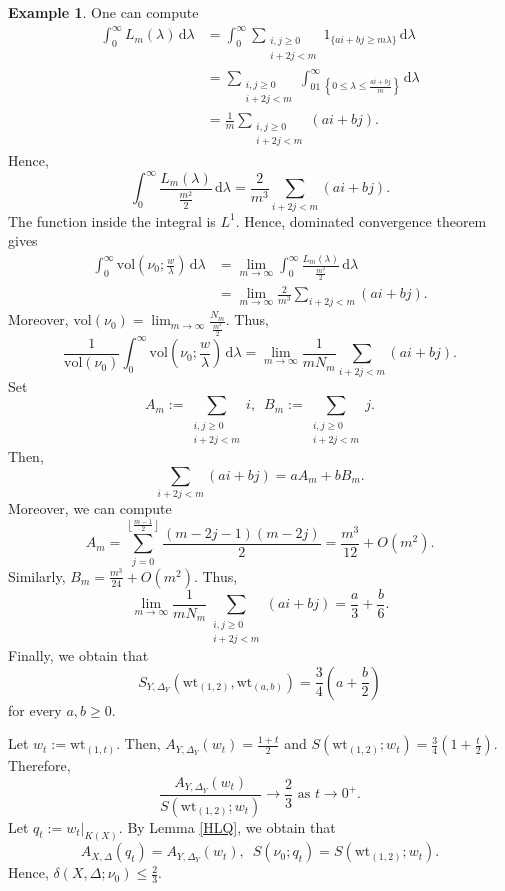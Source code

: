 \documentclass[a4paper,12pt]{amsart}
\theoremstyle{definition} %
\newtheorem{example}[theorem]{Example}
\theoremstyle{remark}
\numberwithin{equation}{section}
\newcommand{\floor}[1]{\left\lfloor #1 \right\rfloor}
\begin{document}
\begin{example}
One can compute
$$ \begin{aligned}
\int^{\infty}_0L_m(\lambda)\,\mathrm{d}\lambda&=\int^{\infty}_0\sum_{\substack{i,j\ge 0 \\ i+2j<m}}1_{\{ai+bj\ge m\lambda\}}\,\mathrm{d}\lambda
\\ &=\sum_{\substack{i,j\ge 0 \\ i+2j<m}}\int^{\infty}_01_{\left\{0\le \lambda\le \frac{ai+bj}{m}\right\}}\,\mathrm{d}\lambda
\\ &=\frac{1}{m}\sum_{\substack{i,j\ge 0 \\ i+2j<m}}(ai+bj).
\end{aligned}$$
Hence,
$$ \int^{\infty}_{0}\frac{L_m(\lambda)}{\frac{m^2}{2}}\,\mathrm{d}\lambda=\frac{2}{m^3}\sum_{i+2j<m}(ai+bj).$$
The function inside the integral is $L^1$. Hence, dominated convergence theorem gives
$$
\begin{aligned}
\int^{\infty}_0\mathrm{vol}\left(\nu_0;\frac{w}{\lambda}\right)\,\mathrm{d}\lambda&=\lim_{m\to \infty}\int^{\infty}_0\frac{L_m(\lambda)}{\frac{m^2}{2}}\,\mathrm{d}\lambda
\\ &=\lim_{m\to \infty}\frac{2}{m^3}\sum_{i+2j<m}(ai+bj).
\end{aligned}
$$
Moreover, $ \mathrm{vol}(\nu_0)=\lim_{m\to \infty}\frac{N_m}{\frac{m^2}{2}}.$ Thus,
$$
\frac{1}{\mathrm{vol}(\nu_0)}\int^{\infty}_0\mathrm{vol}\left(\nu_0;\frac{w}{\lambda}\right)\,\mathrm{d}\lambda=\lim_{m\to \infty}\frac{1}{mN_m}\sum_{i+2j<m}(ai+bj).
$$
Set
$$A_m:=\sum_{\substack{i,j\ge0\\i+2j<m}}i,\,\,\,
B_m:=\sum_{\substack{i,j\ge0\\i+2j<m}}j.$$
Then,
$$\sum_{i+2j<m}(ai+bj)=aA_m+bB_m.$$
Moreover, we can compute
$$ A_m=\sum^{\floor{\frac{m-1}{2}}}_{j=0}\frac{(m-2j-1)(m-2j)}{2}=\frac{m^3}{12}+O(m^2).$$
Similarly, $B_m=\frac{m^3}{24}+O(m^2)$. Thus,
$$ \lim_{m\to \infty}\frac{1}{mN_m}\sum_{\substack{i,j\ge 0 \\ i+2j<m}}(ai+bj)=\frac{a}{3}+\frac{b}{6}.$$
Finally, we obtain that
\begin{equation} \label{gpt1}
S_{Y,\Delta_Y}(\mathrm{wt}_{(1,2)},\mathrm{wt}_{(a,b)})=\frac{3}{4}\left(a+\frac{b}{2}\right)
\end{equation}
for every $a,b\ge 0$.

\smallskip

Let $w_t:=\mathrm{wt}_{(1,t)}$. Then, $A_{Y,\Delta_Y}(w_t)=\frac{1+t}{2}$ and $S(\mathrm{wt}_{(1,2)};w_t)=\frac{3}{4}\left(1+\frac{t}{2}\right)$. Therefore,
$$ \frac{A_{Y,\Delta_Y}(w_t)}{S(\mathrm{wt}_{(1,2)};w_t)}\to \frac{2}{3}\text{ as }t\to 0^+.$$
Let $q_t:=w_t|_{K(X)}$. By Lemma \ref{HLQ}, we obtain that
\begin{equation} \label{gpt2}
A_{X,\Delta}(q_t)=A_{Y,\Delta_Y}(w_t),\,\,\, S(\nu_0;q_t)=S(\mathrm{wt}_{(1,2)};w_t).
\end{equation}
Hence, $\delta(X,\Delta;\nu_0)\le \frac{2}{3}$.


\end{example}
\end{document}
